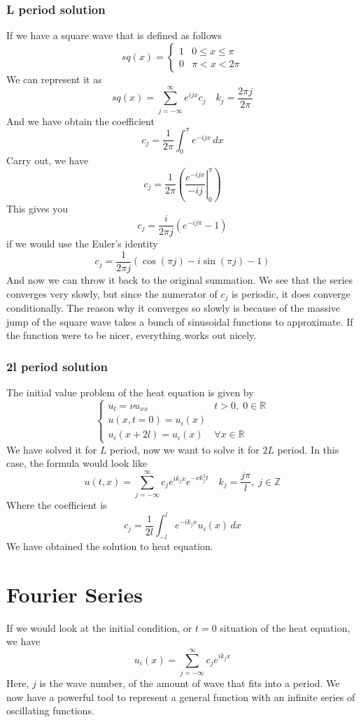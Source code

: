 \documentclass[12pt]{book}
\newcommand{\Z}{\mathbb{Z}}
\newcommand{\R}{\mathbb{R}}
\newcommand{\paren}[1]{\left( #1 \right)}
\begin{document}
\subsubsection{L period solution}
If we have a square wave that is defined as follows
\[
sq(x) = \begin{cases}
    1 & 0\leq x\leq \pi\\
    0 & \pi < x < 2\pi
\end{cases}
\]
We can represent it as
\[
sq(x) = \sum_{j=-\infty}^\infty e^{ijx}c_j \quad k_j = \frac{2\pi j}{2\pi}
\]
And we have obtain the coefficient
\[
c_j = \frac{1}{2\pi}\int_0^\pi e^{-ijx}\,dx
\]
Carry out, we have
\[
c_j = \frac{1}{2\pi}\paren{\left. \frac{e^{-ijx}}{-ij}\right|_0^\pi}
\]
This gives you 
\[
c_j = \frac{i}{2\pi j}\paren{e^{-ij\pi}-1}
\]
if we would use the Euler's identity
\[
c_j = \frac{1}{2\pi j }\paren{\cos\paren{\pi j} - i\sin\paren{\pi j} - 1}
\]
And now we can throw it back to the original summation. We see that the series converges very slowly, but since the numerator of $c_j$ is periodic, it does converge conditionally. The reason why it converges so slowly is because of the massive jump of the square wave takes a bunch of sinusoidal functions to approximate. If the function were to be nicer, everything works out nicely. 
\subsubsection{2l period solution}
The initial value problem of the heat equation is given by
\[
\begin{cases}
    u_t = \nu u_{xx} & t>0,\; 0\in\R \\
    u(x,t=0)=u_i(x)\\
    u_i(x+2l) = u_i(x) & \forall x\in \R
\end{cases}
\]
We have solved it for $L$ period, now we want to solve it for $2L$ period. In this case, the formula would look like
\[
u(t,x) =\sum_{j=-\infty}^{\infty}c_j e^{ik_j x}e^{-\nu k_j^2 t} \quad k_j = \frac{j\pi}{l},\; j\in \Z
\]
Where the coefficient is
\[
c_j =\frac{1}{2l} \int_{-l}^{l}e^{-ik_jx}u_i(x)\,dx
\]
We have obtained the solution to heat equation. 

\section{Fourier Series}
If we would look at the initial condition, or $t=0$ situation of the heat equation, we have
\[
u_i(x) = \sum_{j=-\infty}^{\infty} c_je^{ik_j x}
\]
Here, $j$ is the wave number, of the amount of wave that fits into a period. We now have a powerful tool to represent a general function with an infinite series of oscillating functions. 
\end{document}
